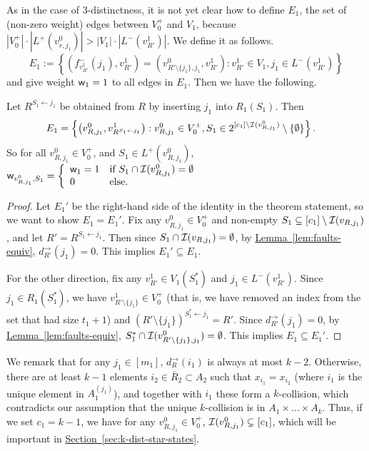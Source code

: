 \documentclass{article}
\renewcommand{\sec}[1]{\hyperref[sec:#1]{Section~\ref*{sec:#1}}}
\newcommand{\lem}[1]{\hyperref[lem:#1]{Lemma~\ref*{lem:#1}}}
\renewcommand{\>}{\rangle}
\newcommand{\<}{\langle}
\renewcommand{\(}{\left(}
\renewcommand{\)}{\right)}
\def\w{{\sf w}}
\begin{document}
As in the case of 3-distinctness, it is not yet clear how to define $E_1$, the set of (non-zero weight) edges between $V_0^+$ and $V_1$, because $|V_0^+|\cdot |L^+(v_{r,j_1}^0)| > |V_1|\cdot |L^-(v_{R'}^1)|$.  We define it as follows.
$$E_1:=\left\{\left(f^-_{v_{R'}^1}(j_1),v_{R'}^1\right)=\left(v_{R'\setminus\{j_1\},j_1}^0,v_{R'}^1\right):v_{R'}^1\in V_1,j_1\in L^-(v_{R'}^1)\right\}$$
and give weight $\w_1=1$ to all edges in $E_1$. Then we have the following.
\begin{lemma}\label{lem:k-dist-E1}
Let $R^{S_1 \leftarrow j_1}$ be obtained from $R$ by inserting $j_1$ into $R_1(S_1)$. Then
\begin{align*}
E_1 &= \left\{\left(v^{0}_{R,j_1},v^{1}_{R^{S_1 \leftarrow j_1}}\right): v_{R,j_1}^0\in V_0^+, S_1 \in 2^{[c_{1}]\setminus {\cal I}(v_{R,j_1}^0)}\setminus \{\emptyset\} \right\}.\label{eq:k-dist-E1}
\end{align*}
So for all $v^0_{R,j_1}\in V_0^+$, and $S_1\in L^+(v^0_{R,j_1})$,
$\displaystyle\w_{v^0_{R,j_1},S_1} = \left\{\begin{array}{ll}
\w_1 =1 & \mbox{if }S_1\cap {\cal I}(v^0_{R,j_1}) = \emptyset\\
0 & \mbox{else.}
\end{array}\right.$
\end{lemma}
\begin{proof}
Let $E_1'$ be the right-hand side of the identity in the theorem statement, so we want to show $E_1=E_1'$. 
Fix any $v_{R,j_1}^0\in V_0^+$ and non-empty $S_1\subseteq [c_1]\setminus {\cal I}(v_{R,j_1})$, and let $R'=R^{S_1\leftarrow j_1}$. Then since $S_1\cap {\cal I}(v_{R,j_1})=\emptyset$, by \lem{faults-equiv}, $d^{\rightarrow}_{R'}(j_1)=0$.
This implies $E_1'\subseteq E_1$.

For the other direction, fix any $v^1_{R'}\in V_1(S_1^*)$ and $j_1\in L^-(v^1_{R'})$. Since $j_1\in R_1(S_1^*)$, we have $v^1_{R'\setminus\{j_1\}}\in V_0^+$ (that is, we have removed an index from the set that had size $t_1+1$) and $(R'\setminus\{j_1\})^{S_1^*\leftarrow j_1}=R'$. Since $d_{R'}^{\rightarrow}(j_1)=0$, by \lem{faults-equiv}, $S_1^*\cap {\cal I}(v_{R'\setminus\{j_1\},j_1}^0)=\emptyset$. This implies $E_1\subseteq E_1'$.
\end{proof}

We remark that for any $j_1\in [m_1]$, $d_R^{\rightarrow}(i_1)$ is always at most $k-2$. Otherwise, there are at least $k-1$ elements $i_2\in \overline{R}_2\subset A_2$ such that $x_{i_1}=x_{i_2}$ (where $i_1$ is the unique element in $A_1^{(j_1)}$), and together with $i_1$ these form a $k$-collision, which contradicts our assumption that the unique $k$-collision is in $A_1\times\dots\times A_k$. Thus, if we set $c_1=k-1$, we have for any $v_{R,j_1}^0\in V_0^+$, ${\cal I}(v_{R,j_1}^0)\subsetneq [c_1]$, which will be important in \sec{k-dist-star-states}.
\end{document}
